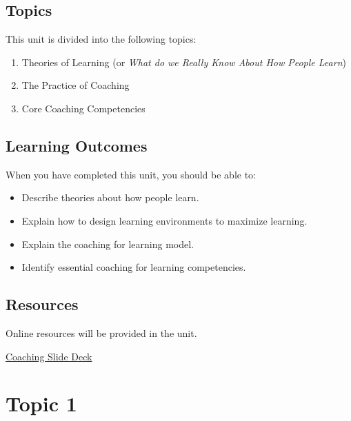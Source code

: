 \documentclass[
]{book}
\providecommand{\tightlist}{%
  \setlength{\itemsep}{0pt}\setlength{\parskip}{0pt}}
\begin{document}
\hypertarget{topics-3}{%
\subsection*{Topics}\label{topics-3}}

This unit is divided into the following topics:

\begin{enumerate}
\def\labelenumi{\arabic{enumi}.}
\tightlist
\item
  Theories of Learning (or \emph{What do we Really Know About How People Learn})
\item
  The Practice of Coaching
\item
  Core Coaching Competencies
\end{enumerate}

\hypertarget{learning-outcomes-2}{%
\subsection*{Learning Outcomes}\label{learning-outcomes-2}}

When you have completed this unit, you should be able to:

\begin{itemize}
\tightlist
\item
  Describe theories about how people learn.
\item
  Explain how to design learning environments to maximize learning.
\item
  Explain the coaching for learning model.
\item
  Identify essential coaching for learning competencies.
\end{itemize}

\hypertarget{resources-4}{%
\subsection*{Resources}\label{resources-4}}

Online resources will be provided in the unit.

\href{https://far.twu.ca/ldrs/663-202103/presentations/coaching\#/coaching-0}{Coaching Slide Deck}

\hypertarget{topic-1-1}{%
\section*{Topic 1}\label{topic-1-1}}
\end{document}
